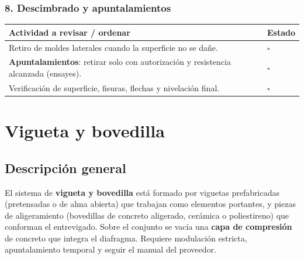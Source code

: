 \documentclass[12pt]{article}
\newcommand{\cbox}{\(\square\)}
\renewcommand{\cbox}{\(\square\)} %
\begin{document}
 \subsubsection*{8. Descimbrado y apuntalamientos}
 \begin{tabularx}{\linewidth}{>{\raggedright\arraybackslash}p{0.93\linewidth} >{\centering\arraybackslash}m{0.07\linewidth}}
 	\toprule
 	\textbf{Actividad a revisar / ordenar} & \textbf{Estado}\\
 	\midrule
 	Retiro de moldes laterales cuando la superficie no se dañe. & \cbox \\
 	\textbf{Apuntalamientos}: retirar solo con autorización y resistencia alcanzada (ensayes). & \cbox \\
 	Verificación de superficie, fisuras, flechas y nivelación final. & \cbox \\
 	\bottomrule
 \end{tabularx}
 
 
 
 
 
 
 
 
 
 \section{Vigueta y bovedilla}
 
 \subsection*{Descripción general}
 El sistema de \textbf{vigueta y bovedilla} está formado por viguetas prefabricadas (pretensadas o de alma abierta) que trabajan como elementos portantes, y piezas de aligeramiento (bovedillas de concreto aligerado, cerámica o poliestireno) que conforman el entrevigado. Sobre el conjunto se vacía una \textbf{capa de compresión} de concreto que integra el diafragma. Requiere modulación estricta, apuntalamiento temporal y seguir el manual del proveedor.
 
\end{document}
